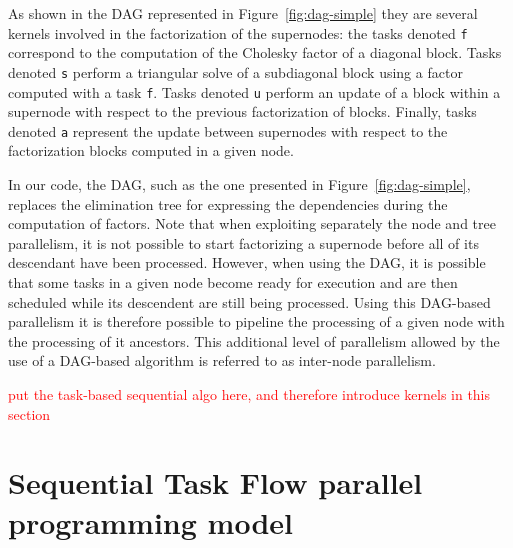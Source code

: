 \documentclass{article}
\newcommand{\alert}[1]{\textcolor{red}{#1}\xspace}
\begin{document}
As shown in the DAG represented in Figure~\ref{fig:dag-simple} they
are several kernels involved in the factorization of the supernodes:
the tasks denoted \texttt{f} correspond to the computation of the
Cholesky factor of a diagonal block. Tasks denoted \texttt{s} perform
a triangular solve of a subdiagonal block using a factor computed with
a task \texttt{f}. Tasks denoted \texttt{u} perform an update of a
block within a supernode with respect to the previous factorization of
blocks. Finally, tasks denoted \texttt{a} represent the update between
supernodes with respect to the factorization blocks computed in a
given node. 

In our code, the DAG, such as the one presented in
Figure~\ref{fig:dag-simple}, replaces the elimination tree for
expressing the dependencies during the computation of factors. Note
that when exploiting separately the node and tree parallelism, it is
not possible to start factorizing a supernode before all of its
descendant have been processed. However, when using the DAG, it is
possible that some tasks in a given node become ready for execution
and are then scheduled while its descendent are still being
processed. Using this DAG-based parallelism it is therefore possible
to pipeline the processing of a given node with the processing of it
ancestors. This additional level of parallelism allowed by the use of
a DAG-based algorithm is referred to as inter-node parallelism.

\alert{put the task-based sequential algo here, and therefore
  introduce kernels in this section}
 
\section{Sequential Task Flow parallel programming model}\label{sec:stf-model}
\end{document}
